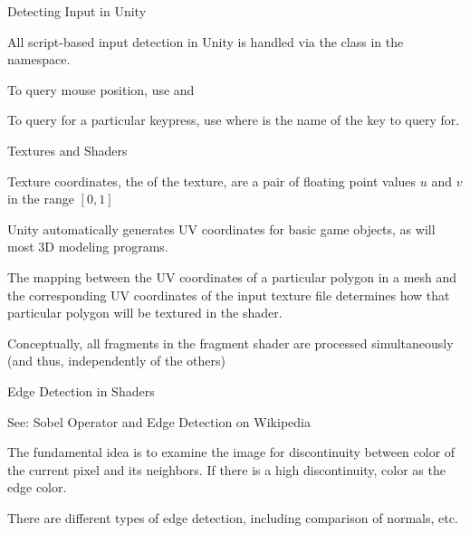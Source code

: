 \documentclass[11pt]{article}
\begin{document}
\maketitle

\begin{topic}{Detecting Input in Unity}
	\item All script-based input detection in Unity is handled via the  class in the  namespace.
	\item To query mouse position, use  and 
	\item To query for a particular keypress, use  where  is the name of the key to query for.
\end{topic}

\begin{topic}{Textures and Shaders}
	\item Texture coordinates, the  of the texture, are a pair of floating point values $u$ and $v$ in the range $[0, 1]$
	\item Unity automatically generates UV coordinates for basic game objects, as will most 3D modeling programs.
	\item The mapping between the UV coordinates of a particular polygon in a mesh and the corresponding UV coordinates of the input texture file determines how that particular polygon will be textured in the shader.
	\item Conceptually, all fragments in the fragment shader are processed simultaneously (and thus, independently of the others)
\end{topic}

\begin{topic}{Edge Detection in Shaders}
	\item See: Sobel Operator and Edge Detection on Wikipedia
	\item The fundamental idea is to examine the image for discontinuity between color of the current pixel and its neighbors. If there is a high discontinuity, color as the edge color.
	\item There are different types of edge detection, including comparison of normals, etc.
\end{topic}
\end{document}
